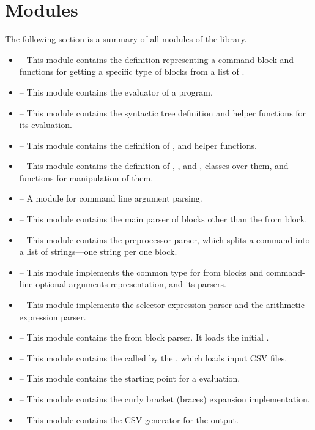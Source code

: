 \section{Modules}
The following section is a summary of all modules of the library.
\begin{itemize}
    \item {} -- This module contains the  definition representing a command block and functions for getting a specific type of blocks from a list of .
    \item {} -- This module contains the evaluator of a \break{} program.
    \item {} -- This module contains the syntactic tree definition and helper functions for its evaluation.
    \item {} -- This module contains the definition of ,  and helper functions.
    \item {} -- This module contains the definition of , , and , classes over them, and functions for manipulation of them.
    \item {} -- A module for command line argument parsing.
    \item {} -- This module contains the main parser of blo\-cks other than the from block.
    \item {} -- This module contains the preprocessor parser, which splits a command into a list of strings---one string per one block.
    \item {} -- This module implements the common  type for from blocks and command-line optional arguments representation, and its parsers.
    \item {} -- This module implements the selector expression parser and the arithmetic expression parser.
    \item {} -- This module contains the from block parser. It loads the initial .
    \item {} -- This module contains the  called by the , which loads input CSV files.
    \item {} -- This module contains the starting point for a  evaluation.
    \item {} -- This module contains the curly bra\-cket (braces) expansion implementation.
    \item {} -- This module contains the CSV generator for the output.
\end{itemize}

